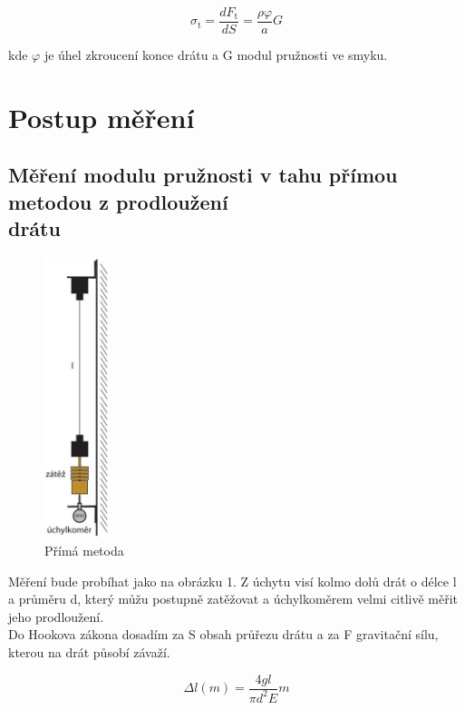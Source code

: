 \documentclass[a4paper,11pt]{article}
\begin{document}
\begin{equation}
  \sigma_{\text{t}} = \frac{dF_{\text{t}}}{dS} = \frac{\rho \varphi}{a} G
\end{equation}

\noindent
kde $\varphi$ je úhel zkroucení konce drátu a G modul pružnosti ve smyku. 

\section{Postup měření}

\subsection{Měření modulu pružnosti v tahu přímou metodou z prodloužení \\ drátu}

\begin{figure}
  \vspace{-9.5em}
  \centering
  \includegraphics[width=53pt]{uchylkomer.jpg}
  \caption{Přímá metoda}
\end{figure}

  \vspace{1em}
Měření bude probíhat jako na obrázku 1. Z úchytu visí kolmo dolů drát o délce l a průměru d, který můžu postupně zatěžovat a úchylkoměrem  velmi citlivě měřit jeho prodloužení. \\

  Do Hookova zákona dosadím za S obsah průřezu drátu a za F gravitační sílu, kterou na drát působí závaží.

\begin{equation}
\Delta l(m) = \frac{4 g l}{\pi d^2 E}m
\end{equation}
\end{document}
